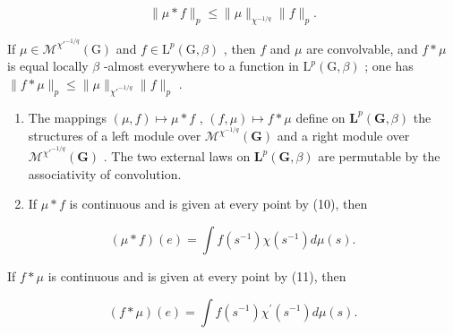 \[
\| \mu * f \| _ {p} \leqslant \| \mu \| _ {\chi^ {- 1 / q}} \| f \| _ {p}.
\]

If \(\mu \in \mathcal{M}^{\chi'^{-1/q}}(\mathrm{G})\) and \(f \in \mathrm{L}^p(\mathrm{G},\beta)\) , then \(f\) and \(\mu\) are convolvable, and \(f * \mu\) is equal locally \(\beta\) -almost everywhere to a function in \(\mathrm{L}^p(\mathrm{G},\beta)\) ; one has \(\| f * \mu \|_p \leqslant \| \mu \|_{\chi'^{-1/q}} \| f \|_p\) .

\begin{enumerate}
\def\labelenumi{\arabic{enumi})}
\setcounter{enumi}{2}
\item
  The mappings \((\mu, f) \mapsto \mu * f\) , \((f, \mu) \mapsto f * \mu\) define on \(\mathbf{L}^p(\mathbf{G}, \beta)\) the structures of a left module over \(\mathcal{M}^{\chi^{-1/q}}(\mathbf{G})\) and a right module over \(\mathcal{M}^{\chi'^{-1/q}}(\mathbf{G})\) . The two external laws on \(\mathbf{L}^p(\mathbf{G}, \beta)\) are permutable by the associativity of convolution.
\item
  If \(\mu * f\) is continuous and is given at every point by (10), then
\end{enumerate}

\[
(\mu * f) (e) = \int f (s ^ {- 1}) \chi (s ^ {- 1}) d \mu (s).\tag{12}
\]

If \(f * \mu\) is continuous and is given at every point by (11), then

\[
(f * \mu) (e) = \int f (s ^ {- 1}) \chi^ {\prime} (s ^ {- 1}) d \mu (s).\tag{13}
\]

